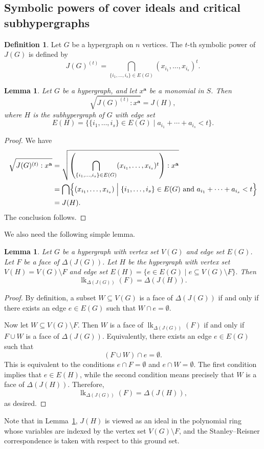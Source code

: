 \documentclass[12pt,amscd]{amsart}
\newtheorem{lem}[thm]{Lemma}
\theoremstyle{definition}
\newtheorem{defn}[thm]{Definition}
\DeclareMathOperator{\lk}{lk}
\def\a {\mathbf a}
\begin{document}
\subsection{Symbolic powers of cover ideals and critical subhypergraphs}
\begin{defn}
Let $G$ be a hypergraph on $n$ vertices. The $t$-th symbolic power of $J(G)$ is defined by
\[
J(G)^{(t)}
=
\bigcap_{\{i_1,\ldots,i_s\} \in E(G)}
(x_{i_1},\ldots,x_{i_s})^t.
\]
\end{defn}

\begin{lem}\label{lem_assrad}
Let $G$ be a hypergraph, and let $x^\a$ be a monomial in $S$. Then
\[
\sqrt{J(G)^{(t)} : x^\a} = J(H),
\]
where $H$ is the subhypergraph of $G$ with edge set
\[
E(H)
=
\bigl\{
\{i_1,\ldots,i_s\} \in E(G)
\;\big|\;
a_{i_1} + \cdots + a_{i_s} < t
\bigr\}.
\]
\end{lem}

\begin{proof}
We have
\begin{align*}
\sqrt{J(G)^{(t)} : x^\a}
&=
\sqrt{
\left(
\bigcap_{\{i_1,\ldots,i_s\} \in E(G)}
(x_{i_1},\ldots,x_{i_s})^t
\right)
: x^\a
} \\
&=
\bigcap
\Bigl\{
(x_{i_1},\ldots,x_{i_s})
\;\Big|\;
\{i_1,\ldots,i_s\} \in E(G)
\text{ and }
a_{i_1} + \cdots + a_{i_s} < t
\Bigr\} \\
&=
J(H).
\end{align*}
The conclusion follows.
\end{proof}

We also need the following simple lemma.
\begin{lem}\label{lem_link}
Let $G$ be a hypergraph with vertex set $V(G)$ and edge set $E(G)$. Let $F$ be a face of $\Delta(J(G))$. Let $H$ be the hypergraph with vertex set \( V(H) = V(G) \setminus F \) and edge set \( E(H) = \{e \in E(G) \mid e \subseteq V(G) \setminus F\}. \) Then
\[
\lk_{\Delta(J(G))}(F) = \Delta(J(H)).
\]
\end{lem}
\begin{proof}
By definition, a subset $W \subseteq V(G)$ is a face of $\Delta(J(G))$ if and only if there exists an edge $e \in E(G)$ such that $W \cap e = \emptyset$.

Now let $W \subseteq V(G) \setminus F$. Then $W$ is a face of $\lk_{\Delta(J(G))}(F)$ if and only if $F \cup W$ is a face of $\Delta(J(G))$. Equivalently, there exists an edge $e \in E(G)$ such that
\[
(F \cup W) \cap e = \emptyset.
\]
This is equivalent to the conditions $e \cap F = \emptyset$ and $e \cap W = \emptyset$. The first condition implies that $e \in E(H)$, while the second condition means precisely that $W$ is a face of $\Delta(J(H))$. Therefore,
\[
\lk_{\Delta(J(G))}(F) = \Delta(J(H)),
\]
as desired.
\end{proof}
Note that in Lemma~\ref{lem_link}, $J(H)$ is viewed as an ideal in the polynomial ring whose variables are indexed by the vertex set $V(G) \setminus F$, and the Stanley--Reisner correspondence is taken with respect to this ground set.
\end{document}

